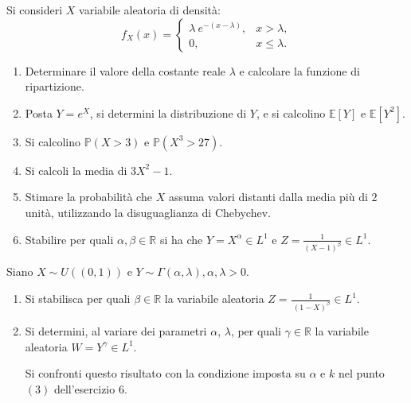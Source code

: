 Si consideri $X$ variabile aleatoria di densità:
\begin{equation*}
f_{X}\left( x\right) =\begin{cases}
\lambda \ e^{-\left( x-\lambda \right)} , & x >\lambda ,\\
0, & x\leq \lambda .
\end{cases}
\end{equation*}
\begin{enumerate}
\item Determinare il valore della costante reale $\lambda $ e calcolare la funzione di ripartizione.
\item Posta $Y=e^{X}$, si determini la distribuzione di $Y$, e si calcolino $\mathbb{E}\left[ Y\right]$ e $\mathbb{E}\left[ Y^{2}\right]$.
\item Si calcolino $\mathbb{P}\left( X >3\right)$ e $\mathbb{P}\left( X^{3}  >27\right)$.
\item Si calcoli la media di $3X^{2} -1$.
\item Stimare la probabilità che $X$ assuma valori distanti dalla media più di $2$ unità, utilizzando la disuguaglianza di Chebychev.
\item Stabilire per quali $\alpha ,\beta \in \mathbb{R}$ si ha che $Y=X^{\alpha } \in L^{1}$ e $Z=\frac{1}{\left( X-1\right)^{\beta }} \in L^{1}$.
\end{enumerate}
\Esercizio{}

Siano $X\sim U\left(\left( 0,1\right)\right)$ e $Y\sim \Gamma \left( \alpha ,\lambda \right) ,\alpha ,\lambda  >0$.
\begin{enumerate}
\item Si stabilisca per quali $\beta \in \mathbb{R}$ la variabile aleatoria $Z=\frac{1}{\ \left( 1-X\right)^{\beta }} \in L^{1}$.
\item Si determini, al variare dei parametri $\alpha $, $\lambda $, per quali $\gamma \in \mathbb{R}$ la variabile aleatoria $W=Y^{\gamma } \in L^{1}$.

Si confronti questo risultato con la condizione imposta su $\alpha $ e $k$ nel punto $\left( 3\right)$ dell'esercizio $6$.
\end{enumerate}
\Esercizio{}

